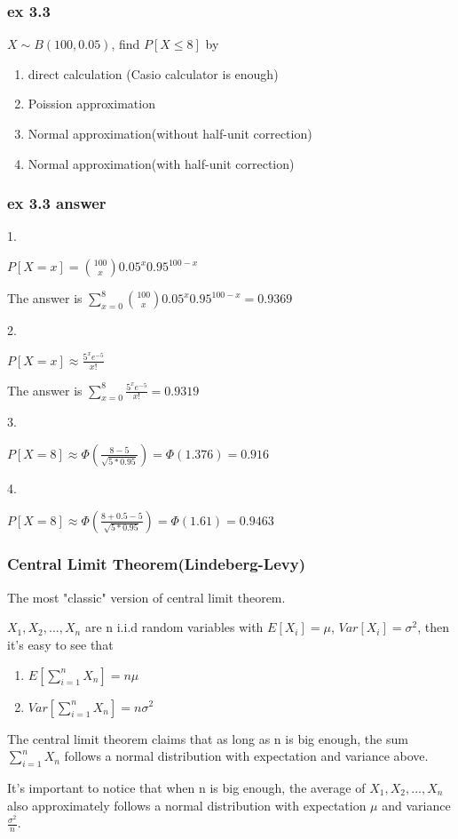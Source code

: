 \documentclass{beamer}
\begin{document}
\begin{frame}
    \frametitle{ex 3.3}
    $X\sim B(100, 0.05)$, find $P[X\leq 8]$ by
    \begin{enumerate}
        \item direct calculation (Casio calculator is enough)
        \item Poission approximation
        \item Normal approximation(without half-unit correction)
        \item Normal approximation(with half-unit correction)
    \end{enumerate}

\end{frame}

\begin{frame}
    \frametitle{ex 3.3 answer}
    1. \par
    $P[X=x]=\binom{100}{x}0.05^x 0.95^{100-x}$\par
    The answer is $\sum\limits_{x=0}^{8} \binom{100}{x}0.05^x 0.95^{100-x}=0.9369$\par
    2. \par
    $P[X=x]\approx \frac{5^x e^{-5}}{x!}$\par
    The answer is $\sum\limits_{x=0}^{8} \frac{5^x e^{-5}}{x!}=0.9319$\par
    3. \par
    $P[X=8]\approx \Phi(\frac{8-5}{\sqrt{5*0.95}})=\Phi(1.376)=0.916$\par
    4. \par
    $P[X=8]\approx \Phi(\frac{8+0.5-5}{\sqrt{5*0.95}})=\Phi(1.61)=0.9463$
    
\end{frame}

\begin{frame}
    \frametitle{Central Limit Theorem(Lindeberg-Levy)}
    The most "classic" version of central limit theorem.\par
    \vspace{0.3cm}
    $X_1, X_2, \dots , X_n$ are n i.i.d random variables with $E[X_i]=\mu$, $Var[X_i]=\sigma^2$, then it's easy to see that
    \begin{enumerate}
        \item $E[\sum\limits_{i=1}^{n}X_n]=n\mu$
        \item $Var[\sum\limits_{i=1}^{n}X_n]=n\sigma^2$
    \end{enumerate}
    The central limit theorem claims that as long as n is big enough, the sum $\sum\limits_{i=1}^{n}X_n$ follows a normal distribution with expectation and variance above.\par
    \vspace{0.3cm}
    It's important to notice that when n is big enough, the average of $X_1, X_2, \dots , X_n$ also approximately follows a normal distribution with expectation $\mu$ and variance $\frac{\sigma^2}{n}$.
    
\end{frame}
\end{document}
